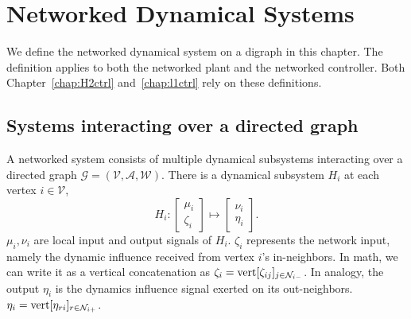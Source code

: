 \chapter{Networked Dynamical Systems}
\label{chap:networksys}
We define the networked dynamical system on a digraph in this chapter. The definition applies to both the networked plant and the networked controller. Both Chapter~\ref{chap:H2ctrl} and~\ref{chap:l1ctrl} rely on these definitions.





\section{Systems interacting over a directed graph}






A networked system consists of multiple dynamical subsystems interacting over a directed graph \(\mathcal{G}= (\mathcal{V}, \mathcal{A}, \mathcal{W})\). 
There is a dynamical subsystem $H_i$ at each vertex \(i \in \mathcal{V}\), 
\begin{equation}\label{eqn::subsysmaps}
H_i \colon \begin{bmatrix}
    \mu_i \\[2pt] \zeta_i
\end{bmatrix}
\mapsto
\begin{bmatrix}
    \nu_i \\[2pt] \eta_i
\end{bmatrix}.
\end{equation}
\(\mu_i, \nu_i\) are local input and output signals of \(H_i\). \(\zeta_i\) represents the network input, namely the dynamic influence received from vertex \(i\)'s in-neighbors. In math, we can write it as a vertical concatenation as $\zeta_i = {\mathrm{vert}}[\zeta_{ij}]_{j \in \mathcal{N}_{i-}}$. In analogy, the output \(\eta_i\) is the dynamics influence signal exerted on its out-neighbors. $\eta_i = {\mathrm{vert}}[\eta_{ri}]_{r \in \mathcal{N}_{i+}}$.

